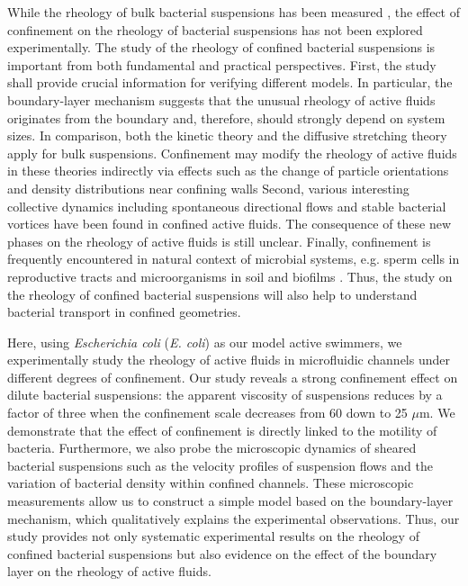 While the rheology of bulk bacterial suspensions has been measured \cite{Gachelin2013, Lopez2015}, the effect of confinement on the rheology of bacterial suspensions has not been explored experimentally. The study of the rheology of confined bacterial suspensions is important from both fundamental and practical perspectives. First, the study shall provide crucial information for verifying different models. In particular,
the boundary-layer mechanism suggests that the unusual rheology of active fluids originates from the boundary and, therefore, should strongly depend on system sizes. In comparison, both the kinetic theory and the diffusive stretching theory apply for bulk suspensions. Confinement
may modify the rheology of active fluids in these theories indirectly via effects such as the change of particle orientations and density distributions near confining walls \cite{Alonso-Matilla2016}
Second, various interesting collective dynamics including spontaneous directional flows \cite{Wioland2016, Wu2017, Lushi2014} and stable bacterial vortices \cite{Lushi2014, Wioland2013, Wioland2016b} have been found in confined active fluids. The consequence of
these new phases on the rheology of active fluids is still unclear.
Finally, confinement is frequently encountered in natural context of microbial systems, e.g. sperm cells in reproductive tracts and microorganisms in soil and biofilms \cite{Foissner1998, Or2007}. Thus, the study on the rheology of
confined bacterial suspensions will also help to understand bacterial transport in confined geometries.

Here, using \textit{Escherichia coli} (\textit{E. coli}) as our model active swimmers, we experimentally study the rheology of active fluids in microfluidic channels under different degrees of confinement.
Our study reveals a strong confinement effect on dilute bacterial suspensions: the apparent viscosity of suspensions reduces by a factor of three when the confinement scale decreases from 60 down to 25 $\mu$m. We demonstrate that the effect of confinement is directly linked to the motility of bacteria. Furthermore, we also probe the microscopic dynamics of sheared bacterial suspensions such as the velocity profiles of
suspension flows and the variation of bacterial density within confined channels. These microscopic measurements allow us to construct a simple model based on the boundary-layer mechanism, which qualitatively explains the experimental observations.
Thus, our study provides not only systematic experimental results on the rheology of confined bacterial suspensions but also evidence on the effect of the boundary layer on the rheology of active fluids.

